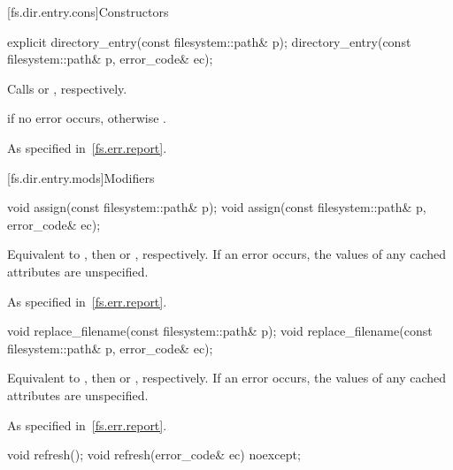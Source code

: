 [fs.dir.entry.cons]{Constructors}

%
\begin{itemdecl}
explicit directory_entry(const filesystem::path& p);
directory_entry(const filesystem::path& p, error_code& ec);
\end{itemdecl}

\begin{itemdescr}
\pnum
\effects
Calls  or , respectively.

\pnum
\ensures
{} if no error occurs,
otherwise .

\pnum
\throws
As specified in~\ref{fs.err.report}.
\end{itemdescr}

[fs.dir.entry.mods]{Modifiers}

%
\begin{itemdecl}
void assign(const filesystem::path& p);
void assign(const filesystem::path& p, error_code& ec);
\end{itemdecl}

\begin{itemdescr}
\pnum
\effects
Equivalent to ,
then  or , respectively.
If an error occurs, the values of any cached attributes are unspecified.

\pnum
\throws
As specified in~\ref{fs.err.report}.
\end{itemdescr}

%
\begin{itemdecl}
void replace_filename(const filesystem::path& p);
void replace_filename(const filesystem::path& p, error_code& ec);
\end{itemdecl}

\begin{itemdescr}
\pnum
\effects
Equivalent to ,
then  or , respectively.
If an error occurs, the values of any cached attributes are unspecified.

\pnum
\throws
As specified in~\ref{fs.err.report}.
\end{itemdescr}

%
\begin{itemdecl}
void refresh();
void refresh(error_code& ec) noexcept;
\end{itemdecl}

